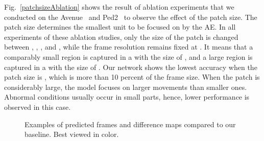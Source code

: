 \documentclass[10pt,twocolumn,letterpaper]{article}
\begin{document}
\vspace{0.3em}
Fig.~\ref{patchsizeAblation} shows the result of ablation experiments that we conducted on the Avenue~\cite{lu2013abnormal} and Ped2~\cite{mahadevan2010anomaly} to observe the effect of the patch size. The patch size determines the smallest unit to be focused on by the AE. In all experiments of these ablation studies, only the size of the patch is changed between , , , and , while the frame resolution remains fixed at . It means that a comparably small region is captured in a  with the size of , and a large region is captured in a  with the size of . Our network shows the lowest accuracy when the patch size is , which is more than 10 percent of the frame size. When the patch is considerably large, the model focuses on larger movements than smaller ones. Abnormal conditions usually occur in small parts, hence, lower performance is observed in this case. 

\begin{figure}[!ht]
	\centering
	
	\vspace{-0.3cm}
	\vspace{-0.3cm}
	\vspace{0.5em}
	\caption{Examples of predicted frames and difference maps compared to our baseline. Best viewed in color.}
	\label{output}
\end{figure}
\end{document}
